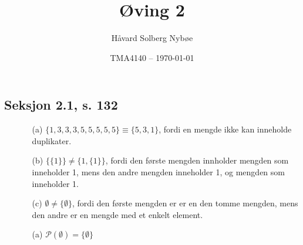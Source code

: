 \documentclass[a4paper, 12pt]{article}  %
\title{Øving 2}               %
\author{Håvard Solberg Nybøe}           %
\date{TMA4140 -- \today}                    %
\begin{document}
\maketitle

\subsection*{Seksjon 2.1, s. 132}
\begin{enumerate}
    \item [\boxed{7}] 
    \begin{enumerate}
        \item [(a)] $ \{1,3,3,3,5,5,5,5,5\} \equiv \{5,3,1\}$, fordi en mengde ikke kan inneholde duplikater. 
        \item [(b)] $\{\{1\}\} \neq  \{1, \{1\}\}$, fordi den første mengden innholder mengden som inneholder 1, mens den andre mengden inneholder 1, og mengden som inneholder 1.
        \item [(c)] $ \emptyset \neq \{\emptyset\}$, fordi den første mengden er er en den tomme mengden, mens den andre er en mengde med et enkelt element.
    \end{enumerate}
    \item [\boxed{26}] 
        \begin{enumerate}
            \item [(a)]$\mathcal{P}(\emptyset) = \{\emptyset\}$
        \end{enumerate}
\end{enumerate}

\end{document}
